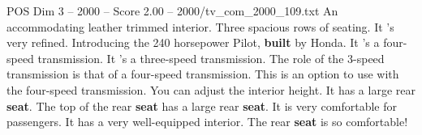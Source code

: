\begin{textsample}{POS Dim 3 – 2000 – Score 2.00 – 2000/tv\_com\_2000\_109.txt}  \label{ex:f3_pos_082}
An accommodating leather trimmed interior.
Three spacious rows of seating.
It 's very refined.
Introducing the 240 horsepower Pilot, \textbf{built} by Honda.
It 's a four-speed transmission.
It 's a three-speed transmission.
The role of the 3-speed transmission is that of a four-speed transmission.
This is an option to use with the four-speed transmission.
You can adjust the interior height.
It has a large rear \textbf{seat}.
The top of the rear \textbf{seat} has a large rear \textbf{seat}.
It is very comfortable for passengers.
It has a very well-equipped interior.
The rear \textbf{seat} is so comfortable!

\end{textsample}
